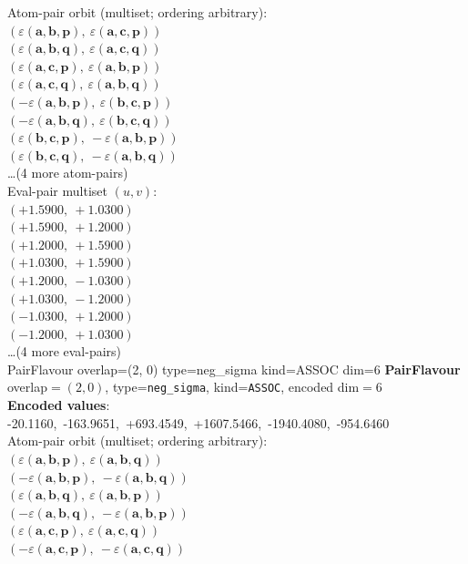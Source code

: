 \documentclass[a4paper,11pt]{article}
\newcommand{\kblbmcpggoncpf}[3]{\varepsilon(\mathbf{#1},\mathbf{#2},\mathbf{#3})}
\begin{document}
\quad Atom-pair orbit (multiset; ordering arbitrary):\\
$(\kblbmcpggoncpf{a}{b}{p},\ \kblbmcpggoncpf{a}{c}{p})$\\
$(\kblbmcpggoncpf{a}{b}{q},\ \kblbmcpggoncpf{a}{c}{q})$\\
$(\kblbmcpggoncpf{a}{c}{p},\ \kblbmcpggoncpf{a}{b}{p})$\\
$(\kblbmcpggoncpf{a}{c}{q},\ \kblbmcpggoncpf{a}{b}{q})$\\
$(-\kblbmcpggoncpf{a}{b}{p},\ \kblbmcpggoncpf{b}{c}{p})$\\
$(-\kblbmcpggoncpf{a}{b}{q},\ \kblbmcpggoncpf{b}{c}{q})$\\
$(\kblbmcpggoncpf{b}{c}{p},\ -\kblbmcpggoncpf{a}{b}{p})$\\
$(\kblbmcpggoncpf{b}{c}{q},\ -\kblbmcpggoncpf{a}{b}{q})$\\
\quad \ldots (4 more atom-pairs)\\
\quad Eval-pair multiset $(u, v)$:\\
$(+1.5900,\ +1.0300)$\\
$(+1.5900,\ +1.2000)$\\
$(+1.2000,\ +1.5900)$\\
$(+1.0300,\ +1.5900)$\\
$(+1.2000,\ -1.0300)$\\
$(+1.0300,\ -1.2000)$\\
$(-1.0300,\ +1.2000)$\\
$(-1.2000,\ +1.0300)$\\
\quad \ldots (4 more eval-pairs)\\
    PairFlavour  overlap=(2, 0)  type=neg\_sigma  kind=ASSOC  dim=6
\textbf{PairFlavour} overlap$=(2, 0)$, type=\texttt{neg\_sigma}, kind=\texttt{ASSOC}, encoded dim$=6$\\
\textbf{      Encoded values}: -20.1160,\ -163.9651,\ +693.4549,\ +1607.5466,\ -1940.4080,\ -954.6460\\
\quad Atom-pair orbit (multiset; ordering arbitrary):\\
$(\kblbmcpggoncpf{a}{b}{p},\ \kblbmcpggoncpf{a}{b}{q})$\\
$(-\kblbmcpggoncpf{a}{b}{p},\ -\kblbmcpggoncpf{a}{b}{q})$\\
$(\kblbmcpggoncpf{a}{b}{q},\ \kblbmcpggoncpf{a}{b}{p})$\\
$(-\kblbmcpggoncpf{a}{b}{q},\ -\kblbmcpggoncpf{a}{b}{p})$\\
$(\kblbmcpggoncpf{a}{c}{p},\ \kblbmcpggoncpf{a}{c}{q})$\\
$(-\kblbmcpggoncpf{a}{c}{p},\ -\kblbmcpggoncpf{a}{c}{q})$\\
\end{document}
